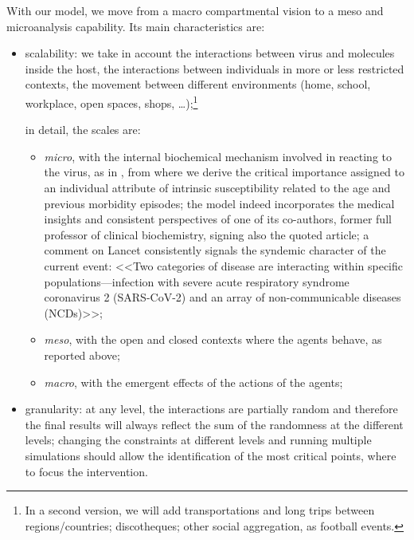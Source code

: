 \documentclass[graybox]{svmult}
\begin{document}
With our model, we move from a macro compartmental vision to a meso and microanalysis capability. Its main characteristics are:

\begin{itemize}

\item
scalability: we take in account the interactions between virus and molecules inside the host, the interactions between individuals in more or less restricted contexts, the movement between different environments (home, school, workplace, open spaces, shops, \ldots);\footnote{In a second version, we will add transportations and long trips between regions/countries; discotheques; other social aggregation, as football events.}

in detail, the scales are: 

\begin{itemize}
\setlength\itemsep{0.3em}
\item
	\emph{micro}, with the internal biochemical mechanism involved in reacting to the virus, as in \cite{Silvagno_2020}, from where we derive the critical importance assigned to an individual attribute of intrinsic susceptibility related to the age and previous morbidity episodes; the model indeed incorporates the medical insights and consistent perspectives of one of its co-authors, former full professor of clinical biochemistry, signing also the quoted article; a comment on Lancet \cite{horton2020offline} consistently signals the syndemic character of the current event: <<Two categories of disease are interacting within specific populations---infection with severe acute respiratory syndrome coronavirus 2 (SARS-CoV-2) and an array of non-communicable diseases (NCDs)>>;
\item
	\emph{meso}, with the open and closed contexts where the agents behave, as reported above;
\item	
	\emph{macro}, with the emergent effects of the actions of the agents;
	
\end{itemize}

\item
granularity: at any level, the interactions are partially random and therefore the final results will always reflect the sum of the randomness at the different levels; changing the constraints at different levels and running multiple simulations should allow the identification of the most critical points, where to focus the intervention.

\end{itemize}
\end{document}
